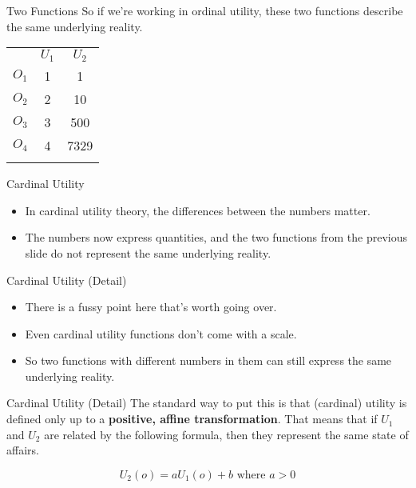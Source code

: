 \documentclass[
  ignorenonframetext,
]{beamer}
\providecommand{\tightlist}{%
  \setlength{\itemsep}{0pt}\setlength{\parskip}{0pt}}
\begin{document}
\begin{frame}{Two Functions}
\protect\hypertarget{two-functions}{}
So if we're working in ordinal utility, these two functions describe the
same underlying reality.

\begin{longtable}[]{@{}lcc@{}}
\toprule
& \(U_1\) & \(U_2\) \\ \addlinespace
\midrule
\endhead
\(O_1\) & 1 & 1 \\ \addlinespace
\(O_2\) & 2 & 10 \\ \addlinespace
\(O_3\) & 3 & 500 \\ \addlinespace
\(O_4\) & 4 & 7329 \\ \addlinespace
\bottomrule
\end{longtable}
\end{frame}

\begin{frame}{Cardinal Utility}
\protect\hypertarget{cardinal-utility}{}
\begin{itemize}
\tightlist
\item
  In cardinal utility theory, the differences between the numbers
  matter.
\item
  The numbers now express quantities, and the two functions from the
  previous slide do not represent the same underlying reality.
\end{itemize}
\end{frame}

\begin{frame}{Cardinal Utility (Detail)}
\protect\hypertarget{cardinal-utility-detail}{}
\begin{itemize}
\tightlist
\item
  There is a fussy point here that's worth going over.
\item
  Even cardinal utility functions don't come with a scale.
\item
  So two functions with different numbers in them can still express the
  same underlying reality.
\end{itemize}
\end{frame}

\begin{frame}{Cardinal Utility (Detail)}
\protect\hypertarget{cardinal-utility-detail-1}{}
The standard way to put this is that (cardinal) utility is defined only
up to a \textbf{positive, affine transformation}. That means that if
\(U_1\) and \(U_2\) are related by the following formula, then they
represent the same state of affairs.

\[
U_2(o) = aU_1(o) + b \text{ where } a > 0
\]
\end{frame}
\end{document}
